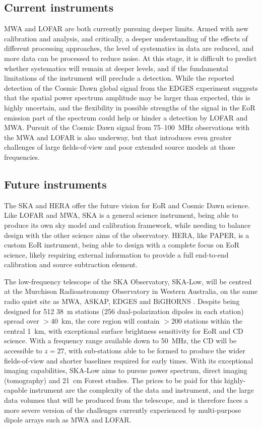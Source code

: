 \subsection{Current instruments}
MWA and LOFAR are both currently pursuing deeper limits. Armed with new calibration and analysis, and critically, a deeper understanding of the effects of different processing approaches, the level of systematics in data are reduced, and more data can be processed to reduce noise. At this stage, it is difficult to predict whether systematics will remain at deeper levels, and if the fundamental limitations of the instrument will preclude a detection. While the reported detection of the Cosmic Dawn global signal from the EDGES experiment \cite{bowman18} suggests that the spatial power spectrum amplitude may be larger than expected, this is highly uncertain, and the flexibility in possible strengths of the signal in the EoR emission part of the spectrum could help or hinder a detection by LOFAR and MWA. Pursuit of the Cosmic Dawn signal from 75--100~MHz observations with the MWA and LOFAR is also underway, but that introduces even greater challenges of large fields-of-view and poor extended source models at those frequencies.

\subsection{Future instruments}
The SKA and HERA offer the future vision for EoR and Cosmic Dawn science. Like LOFAR and MWA, SKA is a general science instrument, being able to produce its own sky model and calibration framework, while needing to balance design with the other science aims of the observatory. HERA, like PAPER, is a custom EoR instrument, being able to design with a complete focus on EoR science, likely requiring external information to provide a full end-to-end calibration and source subtraction element.

The low-frequency telescope of the SKA Observatory, SKA-Low, will be centred at the Murchison Radioastronomy Observatory in Western Australia, on the same radio quiet site as MWA, ASKAP, EDGES and BiGHORNS \cite{koopmans15,dewdney16}. Despite being designed for 512 38~m stations (256 dual-polarization dipoles in each station) spread over $>$40~km, the core region will contain $>$200 stations within the central 1~km, with exceptional surface brightness sensitivity for EoR and CD science. With a frequency range available down to 50~MHz, the CD will be accessible to $z=27$, with sub-stations able to be formed to produce the wider fields-of-view and shorter baselines required for early times. With its exceptional imaging capabilities, SKA-Low aims to pursue power spectrum, direct imaging (tomography) and 21~cm Forest studies. The prices to be paid for this highly-capable instrument are the complexity of the data and instrument, and the large data volumes that will be produced from the telescope, and is therefore faces a more severe version of the challenges currently experienced by multi-purpose dipole arrays such as MWA and LOFAR.

